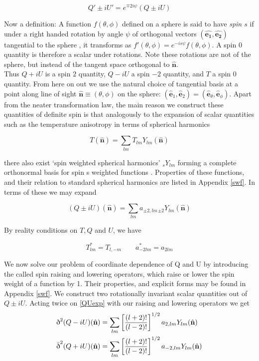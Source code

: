 \documentclass[a4paper,10pt]{article}
\renewcommand{\v}[1]{\mathbf{#1}}
\newcommand{\unit}[1]{\hat{\v{#1}}}
\newcommand{\sr}{\text{\normalfont\dh}}
\renewcommand{\sl}{\bar{\text{\normalfont\dh}}}
\newcommand{\ltwo}{\left[\frac{(l+2)!}{(l-2)!}\right]}
\begin{document}
\begin{equation}
Q'\pm iU' = e^{\mp 2i\psi}(Q\pm iU)
\end{equation}

Now a definition: A function $f(\theta, \phi)$ defined on a sphere is said to have \textit{spin $s$} if under a right handed rotation by angle $\psi$ of orthogonal vectors $(\unit{e_1}, \unit{e_2})$ tangential to the sphere , it transforms as $f'(\theta, \phi) = e^{-is\psi}f(\theta, \phi)$. A spin 0 quantity is therefore a scalar under rotations. Note these rotations are not of the sphere, but instead of the tangent space orthogonal to $\unit{n}$.\\

Thus $Q+iU$ is a spin $2$ quantity, $Q-iU$ a spin $-2$ quantity, and $T$ a spin $0$ quantity. From here on out we use the natural choice of tangential basis at a point along line of sight $\unit{n} \equiv (\theta, \phi)$ on the sphere: $(\unit{e}_1, \unit{e}_2) = (\unit{e}_\theta, \unit{e}_\phi)$. Apart from the neater transformation law, the main reason we construct these quantities of definite spin is that analogously to the expansion of scalar quantities such as the temperature anisotropy in terms of spherical harmonics

\begin{equation}
T(\unit{n}) = \sum_{lm} T_{lm}Y_{lm}(\unit{n})
\end{equation}

there also exist `spin weighted spherical harmonics' $_sY_{lm}$ forming a complete orthonormal basis for spin s weighted functions \cite{all-sky}. Properties of these functions, and their relation to standard spherical harmonics are listed in Appendix \ref{swf}. In terms of these we may expand

\begin{equation}
(Q\pm iU)(\unit{n}) = \sum_{lm} a_{\pm2,lm} {}_{\pm2}Y_{lm}(\unit{n})
\label{QUexp}
\end{equation}

By reality conditions on $T, Q$ and $U$, we have

\begin{equation}
T_{lm}^* = T_{l,-m} \qquad a_{-2lm}^*=a_{2lm}
\end{equation}

We now solve our problem of coordinate dependence of Q and U by introducing the called spin raising and lowering operators, which raise or lower the spin weight of a function by 1. Their properties, and explicit forms may be found in Appendix \ref{swf}. We construct two rotationally invariant scalar quantities out of $Q\pm iU$. Acting twice on \ref{QUexp} with our raising and lowering operators we get
\begin{equation}\begin{split}
\sr^2(Q-iU)(\unit{n}) &= \sum_{lm} \ltwo^{1/2} a_{2,lm} {}Y_{lm}(\unit{n})\\
\sl^2(Q+iU)(\unit{n}) &= \sum_{lm} \ltwo^{1/2} a_{-2,lm} {}Y_{lm}(\unit{n})
\end{split}\end{equation}
\end{document}
